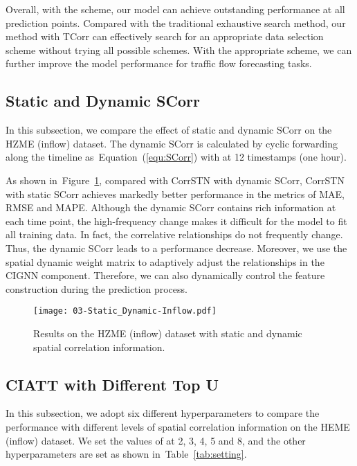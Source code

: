 \documentclass[sn-mathphys,iicol]{sn-jnl}
\newcommand\figref[1]{Figure~\ref{#1}}
\newcommand\tabref[1]{Table~\ref{#1}}
\newcommand\equref[1]{Equation~(\ref{#1})}
\theoremstyle{thmstyleone}\newtheorem{theorem}{Theorem}\newtheorem{proposition}[theorem]{Proposition}
\theoremstyle{thmstyletwo}\newtheorem{example}{Example}\newtheorem{remark}{Remark}
\theoremstyle{thmstylethree}\newtheorem{definition}{Definition}
\begin{document}
Overall, with the  scheme, our model can achieve outstanding performance at all prediction points. Compared with the traditional exhaustive search method, our method with TCorr can effectively search for an appropriate data selection scheme without trying all possible schemes. With the appropriate scheme, we can further improve the model performance for traffic flow forecasting tasks.







\subsection{Static and Dynamic SCorr}
\label{sec:sta-dyn}
In this subsection, we compare the effect of static and dynamic SCorr on the HZME (inflow) dataset. The dynamic SCorr is calculated by cyclic forwarding along the timeline as~\equref{equ:SCorr} with  at 12 timestamps (one hour). 

As shown in~\figref{fig:static-dynamic}, compared with CorrSTN with dynamic SCorr, CorrSTN with static SCorr achieves markedly better performance in the metrics of MAE, RMSE and MAPE. Although the dynamic SCorr contains rich information at each time point, the high-frequency change makes it difficult for the model to fit all training data. In fact, the correlative relationships do not frequently change. Thus, the dynamic SCorr leads to a performance decrease. Moreover, we use the spatial dynamic weight matrix to adaptively adjust the relationships in the CIGNN component. Therefore, we can also dynamically control the feature construction during the prediction process.

\begin{figure}[h]
\centering
\texttt{[image: 03-Static\_Dynamic-Inflow.pdf]}
\caption{Results on the HZME (inflow) dataset with static and dynamic spatial correlation information.}
\label{fig:static-dynamic}
\end{figure}

\subsection{CIATT with Different Top U}
In this subsection, we adopt six different  hyperparameters to compare the performance with different levels of spatial correlation information on the HEME (inflow) dataset. We set the values of  at 2, 3, 4, 5 and 8, and the other hyperparameters are set as shown in~\tabref{tab:setting}.
\end{document}
